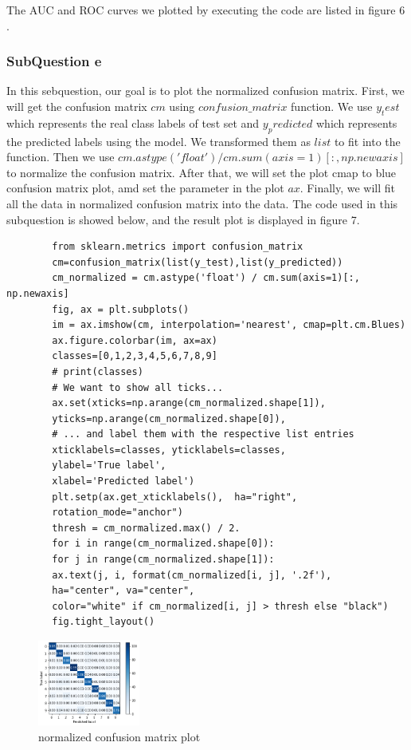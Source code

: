 \documentclass[conference]{IEEEtran}
\begin{document}
	The AUC and ROC curves we plotted by executing the code are listed in figure $6$.
	
	
	\subsubsection{SubQuestion e}
	In this sebquestion, our goal is to plot the normalized confusion matrix.
    First, we will get the confusion matrix $cm$ using $confusion\_matrix$ function.
    We use $y_test$ which represents the real class labels of test set and $y_predicted$ which represents the predicted labels using the model.
    We transformed them as $list$ to fit into the function.
    Then we use $cm.astype('float') / cm.sum(axis=1)[:, np.newaxis]$ to normalize the confusion matrix.
    After that, we will set the plot cmap to blue confusion matrix plot, amd set the parameter in the plot $ax$.
    Finally, we will fit all the data in normalized confusion matrix into the data.
	The code used in this subquestion is showed below, and the result plot is displayed in figure 7.
	\begin{lstlisting}
		from sklearn.metrics import confusion_matrix
		cm=confusion_matrix(list(y_test),list(y_predicted))
		cm_normalized = cm.astype('float') / cm.sum(axis=1)[:, np.newaxis]
		fig, ax = plt.subplots()
		im = ax.imshow(cm, interpolation='nearest', cmap=plt.cm.Blues)
		ax.figure.colorbar(im, ax=ax)
		classes=[0,1,2,3,4,5,6,7,8,9]
		# print(classes)
		# We want to show all ticks...
		ax.set(xticks=np.arange(cm_normalized.shape[1]),
		yticks=np.arange(cm_normalized.shape[0]),
		# ... and label them with the respective list entries
		xticklabels=classes, yticklabels=classes,
		ylabel='True label',
		xlabel='Predicted label')
		plt.setp(ax.get_xticklabels(),  ha="right",
		rotation_mode="anchor")
		thresh = cm_normalized.max() / 2.
		for i in range(cm_normalized.shape[0]):
		for j in range(cm_normalized.shape[1]):
		ax.text(j, i, format(cm_normalized[i, j], '.2f'),
		ha="center", va="center",
		color="white" if cm_normalized[i, j] > thresh else "black")
		fig.tight_layout()
	\end{lstlisting}
	
	\begin{figure}[h] 
		\centering
		\includegraphics[width=0.3\textwidth]{T1Q3e.png}
		\caption{normalized confusion matrix plot}
		\label{Fig.t1q3e}
	\end{figure}
\end{document}
